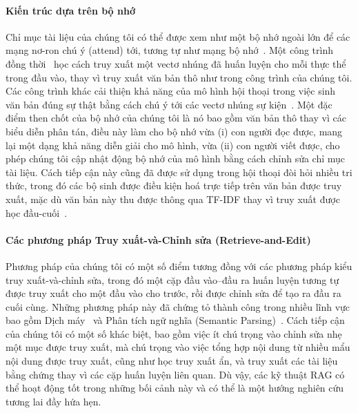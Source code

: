 \documentclass[10pt,letterpaper]{article}
\begin{document}
\paragraph{Kiến trúc dựa trên bộ nhớ}
Chỉ mục tài liệu của chúng tôi có thể được xem như một bộ nhớ ngoài lớn để các
mạng nơ-ron chú ý (attend) tới, tương tự như mạng bộ nhớ~\cite{b64,b55}. Một
công trình đồng thời~\cite{b14} học cách truy xuất một vectơ nhúng đã huấn
luyện cho mỗi thực thể trong đầu vào, thay vì truy xuất văn bản thô như trong
công trình của chúng tôi. Các công trình khác cải thiện khả năng của mô hình
hội thoại trong việc sinh văn bản đúng sự thật bằng cách chú ý tới các vectơ
nhúng sự kiện~\cite{b15,b13}. Một đặc điểm then chốt của bộ nhớ của chúng tôi
là nó bao gồm văn bản thô thay vì các biểu diễn phân tán, điều này làm cho bộ
nhớ vừa (i) con người đọc được, mang lại một dạng khả năng diễn giải cho mô
hình, vừa (ii) con người viết được, cho phép chúng tôi cập nhật động bộ nhớ của
mô hình bằng cách chỉnh sửa chỉ mục tài liệu. Cách tiếp cận này cũng đã được sử
dụng trong hội thoại đòi hỏi nhiều tri thức, trong đó các bộ sinh được điều
kiện hoá trực tiếp trên văn bản được truy xuất, mặc dù văn bản này thu được
thông qua TF-IDF thay vì truy xuất được học đầu-cuối~\cite{b9}.

\paragraph{Các phương pháp Truy xuất-và-Chỉnh sửa (Retrieve-and-Edit)}
Phương pháp của chúng tôi có một số điểm tương đồng với các phương pháp kiểu
truy xuất-và-chỉnh sửa, trong đó một cặp đầu vào--đầu ra huấn luyện tương tự
được truy xuất cho một đầu vào cho trước, rồi được chỉnh sửa để tạo ra đầu ra
cuối cùng. Những phương pháp này đã chứng tỏ thành công trong nhiều lĩnh vực
bao gồm Dịch máy~\cite{b18,b22} và Phân tích ngữ nghĩa (Semantic
Parsing)~\cite{b21}. Cách tiếp cận của chúng tôi có một số khác biệt, bao gồm
việc ít chú trọng vào chỉnh sửa nhẹ một mục được truy xuất, mà chú trọng vào
việc tổng hợp nội dung từ nhiều mẩu nội dung được truy xuất, cũng như học truy
xuất ẩn, và truy xuất các tài liệu bằng chứng thay vì các cặp huấn luyện liên
quan. Dù vậy, các kỹ thuật RAG có thể hoạt động tốt trong những bối cảnh này và
có thể là một hướng nghiên cứu tương lai đầy hứa hẹn.

\end{document}
